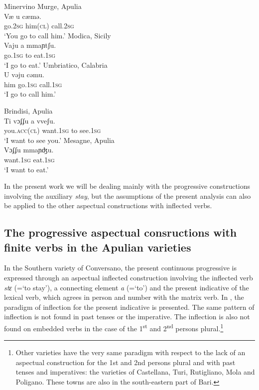 \documentclass[output=paper]{langsci/langscibook}
\begin{document}
\ea%
    \label{ex:lorusso:12}
    \ea  {}Minervino Murge, Apulia\\
    \gll Væ    u    cæmə.\\
         go.\textsc{2sg}  him(\textsc{cl})   call.\textsc{2sg}    \\
    \glt ‘You go to call him.’
    \ex  Modica, Sicily\\
    \gll Vaju    a  mmaɲtʃu.       \\
         go.\textsc{1sg} to  eat.\textsc{1sg}\\
    \glt ‘I go to eat.’     
    \ex  Umbriatico, Calabria\\
    \gll U    vəju    cəmu.\\
         him  go.\textsc{1sg}  call.\textsc{1sg}\\
    \glt ‘I go to call him.’
    \z
\z

\ea%
    \label{ex:lorusso:13}
    \ea  {}Brindisi, Apulia\\
    \gll Ti      vɔʄʄu    a  vveʃu.    \\
         you\textsc{.acc(cl)} want.\textsc{1sg}  to  see.\textsc{1sg}\\
    \glt ‘I want to see you.’
    \ex  {}Mesagne, Apulia\\
    \gll Vɔʄʄu    mmaɲʤu.          \\
         want.\textsc{1sg}   eat.\textsc{1sg}\\
    \glt ‘I want to eat.’
\z
\z

In the present work we will be dealing mainly with the progressive constructions involving the auxiliary \textit{stay}, but the assumptions of the present analysis can also be applied to the other aspectual constructions with inflected verbs.

\subsection{The progressive aspectual consructions with finite verbs in the Apulian varieties}%

In the Southern  variety of Conversano, the present continuous progressive is expressed through an aspectual inflected construction involving the inflected  verb \textit{stɛ} (=‘to stay’), a connecting element \textit{a} (=‘to’) and the present indicative of the lexical verb, which agrees in person and number with the matrix verb. In , the paradigm of inflection for the present indicative is presented. The same pattern of inflection is not found in past tenses or the imperative. The inflection is also not found on embedded verbs in the case of the 1\textsuperscript{st} and 2\textsuperscript{nd} persons plural.\footnote{Other varieties have the very same paradigm with respect to the lack of an aspectual  construction for the 1st and 2nd persons plural and with past tenses and imperatives: the varieties of Castellana, Turi, Rutigliano, Mola and Poligano. These towns are also in the south-eastern part of Bari.} 
\end{document}
